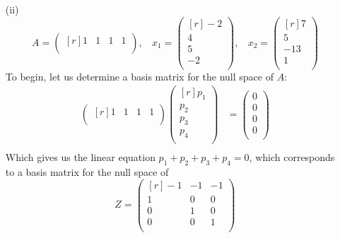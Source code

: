 \documentclass{article}
\begin{document}
\begin{itemize}
        \item[(ii)]
        \[A = \begin{pmatrix*}[r] 
            1 & 1 & 1 & 1\\
        \end{pmatrix*}, \:\:\:\: x_1 = \begin{pmatrix*}[r]
            -2\\
            4\\
            5\\
            -2\\
        \end{pmatrix*}, \:\:\:\: x_2 = \begin{pmatrix*}[r]
            7\\
            5\\
            -13\\
            1\\
        \end{pmatrix*}\]
        To begin, let us determine a basis matrix for the null space of $A$:
        \begin{align*}
            \begin{pmatrix*}[r]
                1 & 1 & 1 & 1\\
            \end{pmatrix*}\begin{pmatrix*}[r]
                p_1\\
                p_2\\
                p_3\\
                p_4\\
            \end{pmatrix*} &= \begin{pmatrix}
                0\\
                0\\
                0\\
                0\\
            \end{pmatrix}\\
        \end{align*}
        Which gives us the linear equation $p_1 + p_2 + p_3 + p_4 = 0$, which corresponds to a basis matrix for the null space of 
        \[Z = \begin{pmatrix*}[r]
            -1 & -1 & -1\\
            1 & 0 & 0\\
            0 & 1 & 0\\
            0 & 0 & 1\\

\end{pmatrix*}\]
\end{itemize}
\end{document}
